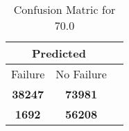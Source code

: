 \begin{table}[] 
\caption{Confusion Matric for 70.0} 
\label{Table: Prediction Accuracy-DMD70.0OnlySunEKF-combinationReflectionEKF-top2-Reflection} 
\centering 
\begin{tabular} 
 {@{}ccc@{}} 
\toprule 
\multicolumn{2}{c}{\textbf{Predicted}}
 \\ \midrule 
\multicolumn{1}{|c|}{Failure} & 
\multicolumn{1}{c|}{No Failure}
 \\ \midrule 
\multicolumn{1}{|c|}{\color{green}\textbf{38247}} & 
\multicolumn{1}{c|}{\color{green}\textbf{73981}}
 \\ \midrule 
\multicolumn{1}{|c|}{\color{red}\textbf{1692}} & 
\multicolumn{1}{c|}{\color{red}\textbf{56208}}
 \\ \bottomrule 
\end{tabular} 
\end{table} 
